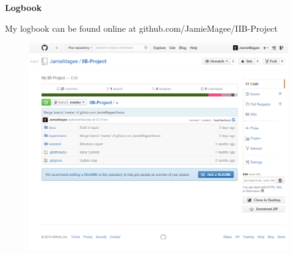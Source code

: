 \documentclass[10pt,a4paper]{article}
\author{Jamie Magee}
\begin{document}
  \begin{center}
    \Large \textbf{Logbook}
  \end{center}
  My logbook can be found online at github.com/JamieMagee/IIB-Project
  
  \begin{figure}[h!]
    \includegraphics[width=\textwidth]{github.png}
  \end{figure}
\end{document}
